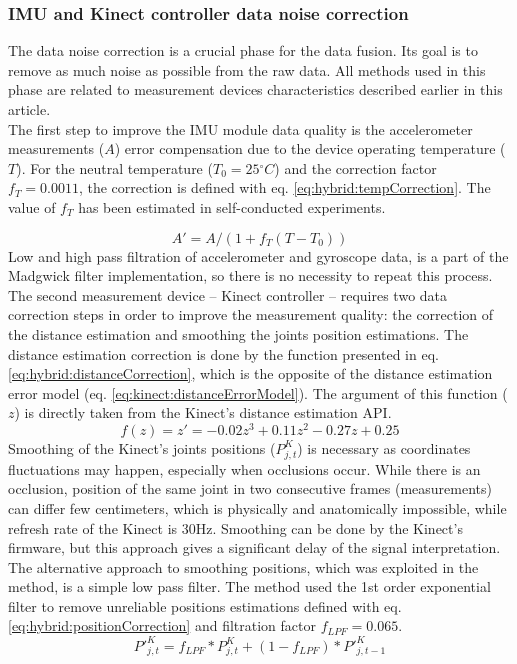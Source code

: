 \documentclass[sensors,article,submit,moreauthors,pdftex,10pt,a4paper]{mdpi}
\newcommand{\degree}{\ensuremath{{}^{\circ}}\xspace}
\begin{document}
	\subsubsection{IMU and Kinect controller data noise correction}
	The data noise correction is a crucial phase for the data fusion. Its goal is to remove as much noise as possible from the raw data. All methods used in this phase are related to measurement devices characteristics described earlier in this article.\\
	The first step to improve the IMU module data quality is the accelerometer measurements ($A$) error compensation due to the device operating temperature ($T$). For the neutral temperature ($T_0=25\degree C$) and the correction factor $f_T= 0.0011$, the correction is defined with eq. \ref{eq:hybrid:tempCorrection}. The value of $f_T$ has been estimated in self-conducted experiments.
		
	\begin{equation}
		A'=A/(1+ f_T (T-T_0))
		\label{eq:hybrid:tempCorrection}
	\end{equation}
	Low and high pass filtration of accelerometer and gyroscope data, is a part of the Madgwick filter implementation, so there is no necessity to repeat this process.
	The second measurement device – Kinect controller – requires two data correction steps in order to improve the measurement quality: the correction of the distance estimation and smoothing the joints position estimations. The distance estimation correction is done by the function presented in eq. \ref{eq:hybrid:distanceCorrection}, which is the opposite of the distance estimation error model (eq. \ref{eq:kinect:distanceErrorModel}). The argument of this function ($z$) is directly taken from the Kinect’s distance estimation API.
	\begin{equation}
		f(z)=z'=-0.02z^3+0.11z^2-0.27z+0.25
		\label{eq:hybrid:distanceCorrection}
	\end{equation}
	Smoothing of the Kinect’s joints positions ($P_{j,t}^K$) is necessary as coordinates fluctuations may happen, especially when occlusions occur. While there is an occlusion, position of the same joint in two consecutive frames (measurements) can differ few centimeters, which is physically and anatomically impossible, while refresh rate of the Kinect is 30Hz. Smoothing can be done by the Kinect’s firmware, but this approach gives a significant delay of the signal interpretation. The alternative approach to smoothing positions, which was exploited in the method, is a simple low pass filter. The method used the 1st order exponential filter to remove unreliable positions estimations defined with eq. \ref{eq:hybrid:positionCorrection} and filtration factor $f_{LPF} = 0.065$.
	\begin{equation}
		{P'}_{j,t}^K=f_{LPF} * P_{j,t}^K+(1-f_{LPF}) * {P'}_{j,t-1}^K
		\label{eq:hybrid:positionCorrection}
	\end{equation}
		
\end{document}
